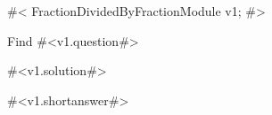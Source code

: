 

#<
FractionDividedByFractionModule v1;
#>

Find #<v1.question#>

#<v1.solution#>

#<v1.shortanswer#>


